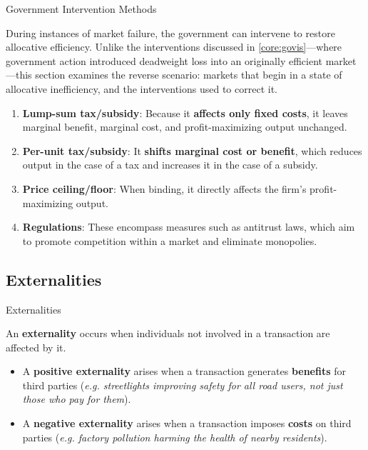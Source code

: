 \documentclass[10pt]{article}
\begin{document}
  \begin{core}{Government Intervention Methods}

    During instances of market failure, the government can intervene to restore allocative efficiency. Unlike the interventions discussed in \autoref{core:govis}---where government action introduced deadweight loss into an originally efficient market---this section examines the reverse scenario: markets that begin in a state of allocative inefficiency, and the interventions used to correct it.

    \begin{enumerate}

      \item \textbf{Lump-sum tax/subsidy}: Because it \textbf{affects only fixed costs}, it leaves marginal benefit, marginal cost, and profit-maximizing output unchanged.

      \item \textbf{Per-unit tax/subsidy}: It \textbf{shifts marginal cost or benefit}, which reduces output in the case of a tax and increases it in the case of a subsidy.

      \item \textbf{Price ceiling/floor}: When binding, it directly affects the firm's profit-maximizing output.

      \item \textbf{Regulations}: These encompass measures such as antitrust laws, which aim to promote competition within a market and eliminate monopolies.

    \end{enumerate}

  \end{core}

  \subsection{Externalities}
    \label{sec:externality}

    \begin{core}{Externalities}

      An \textbf{externality} occurs when individuals not involved in a transaction are affected by it.

      \begin{itemize}

        \item A \textbf{positive externality} arises when a transaction generates \textbf{benefits} for third parties (\textit{e.g. streetlights improving safety for all road users, not just those who pay for them}).

        \item A \textbf{negative externality} arises when a transaction imposes \textbf{costs} on third parties (\textit{e.g. factory pollution harming the health of nearby residents}).

      \end{itemize}
     
    \end{core}
\end{document}
